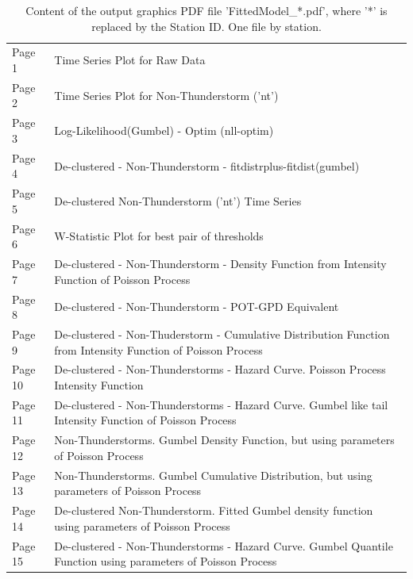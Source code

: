 \documentclass[12pt,oneside]{reedthesis}
\begin{document}
\begingroup\fontsize{8}{10}\selectfont
\begin{longtable}[t]{>{\raggedright\arraybackslash}p{0.4in}>{\raggedright\arraybackslash}p{5.7in}}
\caption[Content of FittedModel\_*.pdf]{\label{tab:fittedmodelidpdf}Content of the output graphics PDF file 'FittedModel\_*.pdf', where '*' is replaced by the Station ID. One file by station.}\\
\toprule
\multicolumn{1}{l}{Graphic} & \multicolumn{1}{l}{Description}\\
\midrule
Page 1 & Time Series Plot for Raw Data\\
Page 2 & Time Series Plot for Non-Thunderstorm ('nt')\\
Page 3 & Log-Likelihood(Gumbel) - Optim (nll-optim)\\
Page 4 & De-clustered - Non-Thunderstorm - fitdistrplus-fitdist(gumbel)\\
Page 5 & De-clustered Non-Thunderstorm ('nt') Time Series\\
Page 6 & W-Statistic Plot for best pair of thresholds\\
Page 7 & De-clustered - Non-Thunderstorm - Density Function from Intensity Function of Poisson Process\\
Page 8 & De-clustered - Non-Thunderstorm - POT-GPD Equivalent\\
Page 9 & De-clustered - Non-Thuderstorm - Cumulative Distribution Function from Intensity Function of Poisson Process\\
Page 10 & De-clustered - Non-Thunderstorms - Hazard Curve. Poisson Process Intensity Function\\
Page 11 & De-clustered - Non-Thunderstorms - Hazard Curve. Gumbel like tail Intensity Function of Poisson Process\\
Page 12 & Non-Thunderstorms. Gumbel Density Function, but using parameters of Poisson Process\\
Page 13 & Non-Thunderstorms. Gumbel Cumulative Distribution, but using parameters of Poisson Process\\
Page 14 & De-clustered Non-Thunderstorm. Fitted Gumbel density function using parameters of Poisson Process\\
Page 15 & De-clustered - Non-Thunderstorms - Hazard Curve. Gumbel Quantile Function using parameters of Poisson Process\\
\bottomrule
\end{longtable}
\endgroup{}
\end{document}
